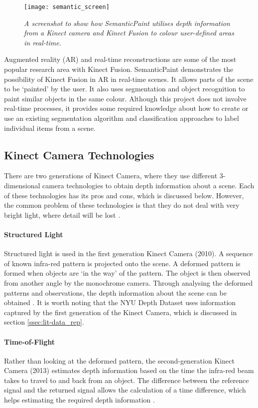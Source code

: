 \begin{figure}[h]
  \centering
  \texttt{[image: semantic\_screen]}
  \caption{\textit{A screenshot to show how SemanticPaint utilises depth information from a Kinect camera and Kinect Fusion to colour user-defined areas in real-time. \protect\cite{semantic-paint}}}
  \label{fig:semantic_screen}
\end{figure}

Augmented reality (AR) and real-time reconstructions are some of the most popular research area with Kinect Fusion. SemanticPaint \cite{semantic-paint} demonstrates the possibility of Kinect Fusion in AR in real-time scenes. It allows parts of the scene to be `painted' by the user. It also uses segmentation and object recognition to paint similar objects in the same colour. Although this project does not involve real-time processes, it provides some required knowledge about how to create or use an existing segmentation algorithm and classification approaches to label individual items from a scene. 

\subsection{Kinect Camera Technologies}
There are two generations of Kinect Camera, where they use different 3-dimensional camera technologies to obtain depth information about a scene. Each of these technologies has its pros and cons, which is discussed below. However, the common problem of these technologies is that they do not deal with very bright light, where detail will be lost \cite{chi-book}. 

\paragraph*{Structured Light}
Structured light is used in the first generation Kinect Camera (2010). A sequence of known infra-red pattern is projected onto the scene. A deformed pattern is formed when objects are `in the way' of the pattern. The object is then observed from another angle by the monochrome camera. Through analysing the deformed patterns and observations, the depth information about the scene can be obtained \cite{chi-book}\cite{kinect-cam-tech}. It is worth noting that the NYU Depth Dataset \cite{nyu-dataset} uses information captured by the first generation of the Kinect Camera, which is discussed in section \ref{ssec:lit-data_rep}.

\paragraph*{Time-of-Flight}
Rather than looking at the deformed pattern, the second-generation Kinect Camera (2013) estimates depth information based on the time the infra-red beam takes to travel to and back from an object. The difference between the reference signal and the returned signal allows the calculation of a time difference, which helps estimating the required depth information \cite{chi-book}.  

